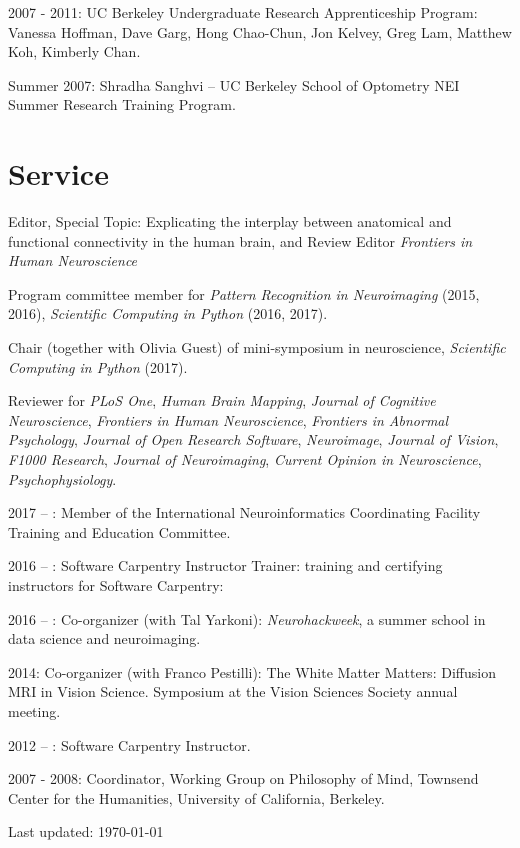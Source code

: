 \documentclass[11pt,fullpage]{article}
\begin{document}
2007 - 2011: UC Berkeley Undergraduate Research Apprenticeship Program: Vanessa Hoffman, Dave Garg, Hong Chao-Chun, Jon Kelvey, Greg Lam, Matthew Koh, Kimberly Chan.

Summer 2007: Shradha Sanghvi -- UC Berkeley School of Optometry NEI Summer Research Training Program.

\section*{Service}

Editor, Special Topic: Explicating the interplay between anatomical and functional connectivity in the human brain, and Review Editor \emph{Frontiers in Human Neuroscience}

\vspace{1cm}

Program committee member for \emph{Pattern Recognition in Neuroimaging} (2015, 2016), \emph{Scientific Computing in Python} (2016, 2017).

\vspace{1cm}

Chair (together with Olivia Guest) of mini-symposium in neuroscience,
\emph{Scientific Computing in Python} (2017).

\vspace{1cm}

Reviewer for \emph{PLoS One}, \emph{Human Brain Mapping}, \emph{Journal of Cognitive Neuroscience}, \emph{Frontiers in Human Neuroscience}, \emph{Frontiers in Abnormal Psychology}, \emph{Journal of Open Research Software}, \emph{Neuroimage}, \emph{Journal of Vision}, \emph{F1000 Research}, \emph{Journal of Neuroimaging}, \emph{Current Opinion in Neuroscience}, \emph{Psychophysiology}.

\vspace{1cm}

2017 -- : Member of the International Neuroinformatics Coordinating Facility Training and Education Committee.

2016 -- : Software Carpentry Instructor Trainer: training and certifying instructors for Software Carpentry:

2016 -- : Co-organizer (with Tal Yarkoni): \emph{Neurohackweek}, a summer school in data science and neuroimaging.

2014: Co-organizer (with Franco Pestilli): The White Matter Matters: Diffusion MRI in Vision Science. Symposium at the Vision Sciences Society annual meeting.

2012 -- : Software Carpentry Instructor.

2007 - 2008: Coordinator, Working Group on Philosophy of Mind, Townsend Center for the Humanities, University of California, Berkeley.

\bigskip
\begin{center}
  \begin{footnotesize}
    Last updated: \today
  \end{footnotesize}
\end{center}

\end{document}
